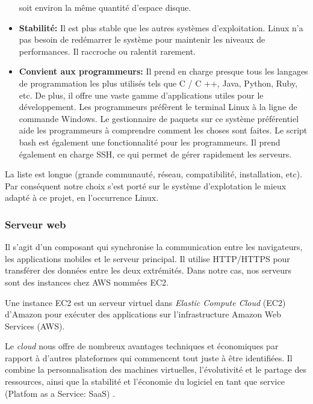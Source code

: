 \begin{itemize}
                soit environ la même quantité d'espace disque.
                \item \textbf{Stabilité: }
                Il est plus stable que les autres systèmes d'exploitation. Linux n'a pas 
                besoin de redémarrer le système pour maintenir les niveaux de performances. 
                Il raccroche ou ralentit rarement.
                \item \textbf{Convient aux programmeurs: }
                Il prend en charge presque tous les langages de programmation les plus utilisés 
                tels que C / C ++, Java, Python, Ruby, etc. De plus, il offre une vaste gamme 
                d'applications utiles pour le développement.
                Les programmeurs préfèrent le terminal Linux à la ligne de commande Windows. 
                Le gestionnaire de paquets sur ce système préférentiel aide les programmeurs à 
                comprendre comment les choses sont faites. Le script bash est également une 
                fonctionnalité pour les programmeurs. Il prend également en charge SSH, 
                ce qui permet de gérer rapidement les serveurs.
                
        \end{itemize}
        La liste est longue (grande communauté, réseau, compatibilité, installation, etc). Par conséquent
        notre choix s'est porté sur le système d'explotation le mieux adapté à ce projet, en l'occurrence Linux.

        \subsubsection{Serveur web}
        Il s'agit d'un composant qui synchronise la communication entre les navigateurs, les applications mobiles et 
        le serveur principal. Il utilise HTTP/HTTPS pour transférer des données entre les deux extrémités.
        Dans notre cas,  nos serveurs sont des instances chez AWS  nommées EC2. 

        Une instance EC2 est un serveur virtuel dans \textit{Elastic Compute Cloud} (EC2) d'Amazon pour exécuter 
        des applications sur l'infrastructure Amazon Web Services (AWS).
        \par 
        Le \textit{cloud} nous offre de nombreux avantages techniques et économiques par rapport à  
       d'autres plateformes qui commencent tout juste à être identifiées. Il combine la 
        personnalisation des machines virtuelles, l'évolutivité et le partage des ressources,
         ainsi que la stabilité et l'économie du logiciel en tant que service 
         (Platfom as a Service: SaaS) \cite{juve2009scientific}.

